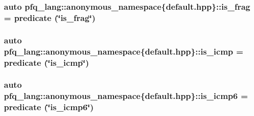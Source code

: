 \hypertarget{namespacepfq__lang_1_1anonymous__namespace_02default_8hpp_03_a8fa70cc0ae09592136e8e04e60a98ab6}{
\subsubsection[{is\+\_\+frag}]{\setlength{\rightskip}{0pt plus 5cm}auto pfq\+\_\+lang\+::anonymous\+\_\+namespace\{default.\+hpp\}\+::is\+\_\+frag = {\bf predicate} (\char`\"{}is\+\_\+frag\char`\"{})}}\label{namespacepfq__lang_1_1anonymous__namespace_02default_8hpp_03_a8fa70cc0ae09592136e8e04e60a98ab6}
\hypertarget{namespacepfq__lang_1_1anonymous__namespace_02default_8hpp_03_aecfdadd54cbd2d4e93a7f246b6bcd0fc}{
\subsubsection[{is\+\_\+icmp}]{\setlength{\rightskip}{0pt plus 5cm}auto pfq\+\_\+lang\+::anonymous\+\_\+namespace\{default.\+hpp\}\+::is\+\_\+icmp = {\bf predicate} (\char`\"{}is\+\_\+icmp\char`\"{})}}\label{namespacepfq__lang_1_1anonymous__namespace_02default_8hpp_03_aecfdadd54cbd2d4e93a7f246b6bcd0fc}
\hypertarget{namespacepfq__lang_1_1anonymous__namespace_02default_8hpp_03_abbce0d21ac217034eac2cd1366f78695}{
\subsubsection[{is\+\_\+icmp6}]{\setlength{\rightskip}{0pt plus 5cm}auto pfq\+\_\+lang\+::anonymous\+\_\+namespace\{default.\+hpp\}\+::is\+\_\+icmp6 = {\bf predicate} (\char`\"{}is\+\_\+icmp6\char`\"{})}}\label{namespacepfq__lang_1_1anonymous__namespace_02default_8hpp_03_abbce0d21ac217034eac2cd1366f78695}
